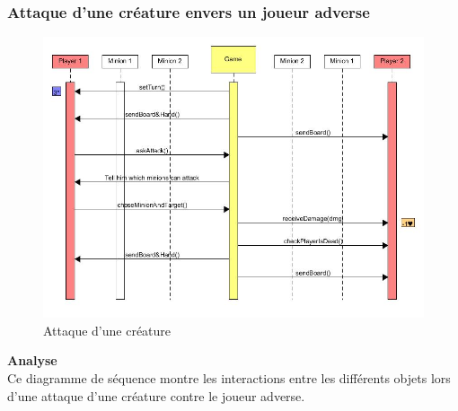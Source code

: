\subsubsection{Attaque d'une créature envers un joueur adverse}
{
\begin{figure}[H]
    \includegraphics[width=1\textwidth,height=1\textwidth]{Images/AttackOnPlayer.jpg}
    \caption{\label{Sequence Diagram Partie} Attaque d'une créature}
\end{figure}
\noindent\textbf{Analyse}\\
Ce diagramme de séquence montre les interactions entre les différents objets  lors d'une attaque d'une créature contre le joueur adverse.
}

